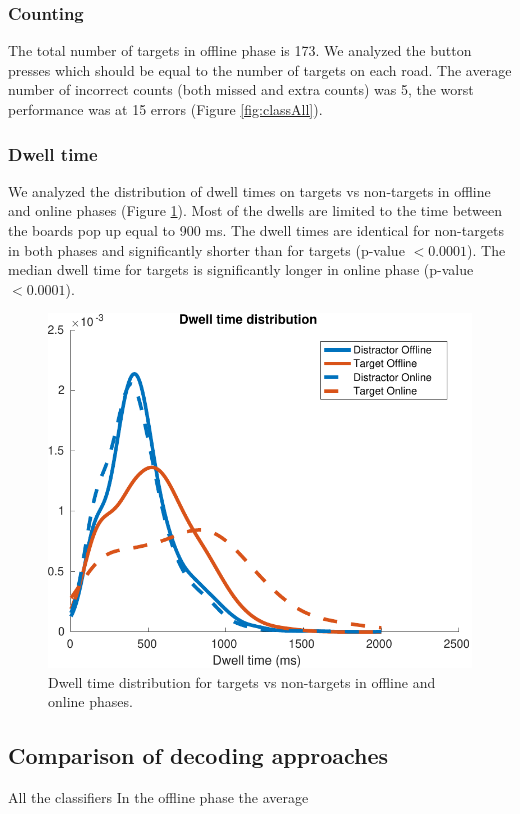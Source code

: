 \documentclass[12pt]{iopart}
\begin{document}
\subsubsection*{Counting}
The total number of targets in offline phase is 173.
We analyzed the button presses which should be equal to the number of targets
on each road.
The average number of incorrect counts (both missed and extra counts) was 5,
the worst performance was at 15 errors (Figure \ref{fig:classAll}).


\subsubsection*{Dwell time}
We analyzed the distribution of dwell times on targets vs non-targets
in offline and online phases (Figure \ref{fig:dwell}). 
Most of the dwells are limited to the time between the boards pop up equal to 900 ms.
The dwell times are identical for non-targets in both phases and significantly
shorter than for targets (p-value $< 0.0001$).
The median dwell time for targets is significantly longer in online phase (p-value $< 0.0001$).

\begin{figure}[!t]
    \includegraphics[trim={0cm 0cm 0cm 0cm},clip,width=0.6\columnwidth]{../images/DwelltimeDist_online_allmean.pdf}
    \caption{Dwell time distribution for targets vs non-targets in offline and online phases.}
\label{fig:dwell}
\end{figure}

\subsection{Comparison of decoding approaches}
All the classifiers
In the offline phase the average
\end{document}
